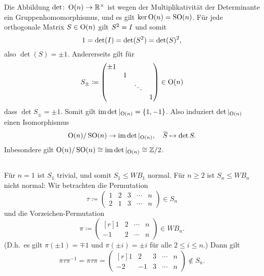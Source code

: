 Die Abbildung $\det \colon \operatorname{O}(n) \to \mathbb{R}^\times$ ist wegen der Multiplikativität der Determinante ein Gruppenhomomorphismus, und es gilt $\ker \operatorname{O}(n) = \operatorname{SO}(n)$.
Für jede orthogonale Matrix $S \in \operatorname{O}(n)$ gilt $S^2 = I$ und somit
\[
    1
  = \det(I)
  = \det(S^2)
  = \det(S)^2,
\]
also $\det(S) = \pm 1$.
Andererseits gilt für
\[
            S_{\pm}
  \coloneqq \begin{pmatrix}
              \pm 1 &   &         &     \\
                    & 1 &         &     \\
                    &   & \ddots  &     \\
                    &   &         & 1
            \end{pmatrix}
  \in       \operatorname{O}(n)
\]
dass $\det S_{\pm} = \pm 1$.
Somit gilt $\im \restrict{\det}{\orthogonal{n}} = \{1, -1\}$.
Also induziert $\restrict{\det}{\orthogonal{n}}$ einen Isomorphismus
\[
          \orthogonal{n} / \sorthogonal{n}
  \to     \im \restrict{\det}{\orthogonal{n}},
  \quad   \class{S}
  \mapsto \det S.
\]
Inbesondere gilt $\orthogonal{n} / \sorthogonal{n} \cong \im \restrict{\det}{\orthogonal{n}} \cong \Integer/2$.





\subsection{}

Für $n = 1$ ist $S_1$ trivial, und somit $S_1 \leq WB_1$ normal.
Für $n \geq 2$ ist $S_n \leq WB_n$ nicht normal:
Wir betrachten die Permutation
\[
            \tau
  \coloneqq \begin{pmatrix}
              1 & 2 & 3 & \dotsm & n  \\
              2 & 1 & 3 & \dotsm & n
            \end{pmatrix}
  \in       S_n
\]
und die Vorzeichen-Permutation
\[
            \pi
  \coloneqq \begin{pmatrix*}[r]
               1 & 2 & \dotsm & n  \\
              -1 & 2 & \dotsm & n
            \end{pmatrix*}
  \in       WB_n.
\]
(D.h.\ es gilt $\pi(\pm 1) = \mp 1$ und $\pi(\pm i) = \pm i$ für alle $2 \leq i \leq n$.)
Dann gilt
\[
    \pi \tau \pi^{-1}
  = \pi \tau \pi
  = \begin{pmatrix*}[r]
       1 &  2 & 3 & \dotsm & n  \\
      -2 & -1 & 3 & \dotsm & n
    \end{pmatrix*}
  \notin S_n.
\]





